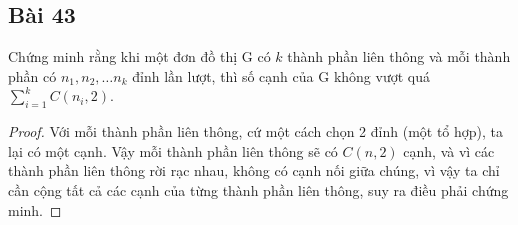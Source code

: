 \subsection*{Bài 43}
Chứng minh rằng khi một đơn đồ thị G có $k$ thành phần liên thông và mỗi thành phần có $n_1,n_2,\dots n_k$ đỉnh lần lượt, thì số cạnh của G không vượt quá $\sum_{i=1}^kC(n_i,2)$.
\begin{proof}
    Với mỗi thành phần liên thông, cứ một cách chọn 2 đỉnh (một tổ hợp), ta lại có một cạnh. Vậy mỗi thành phần liên thông sẽ có $C(n,2)$ cạnh, và vì các thành phần liên thông rời rạc nhau, không có cạnh nối giữa chúng, vì vậy ta chỉ cần cộng tất cả các cạnh của từng thành phần liên thông, suy ra điều phải chứng minh.
\end{proof}
